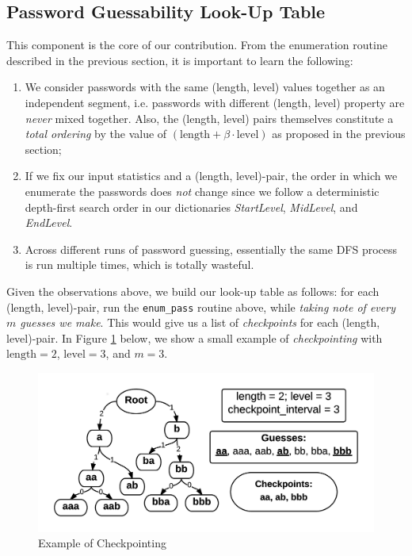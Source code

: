 \documentclass{article} %
\theoremstyle{definition}
\theoremstyle{theorem}
\theoremstyle{remark}
\theoremstyle{remark}
\begin{document}
\subsection{Password Guessability Look-Up Table} \label{sect:lookup}
\par\quad This component is the core of our contribution. From the enumeration routine described in the previous section, it is important to learn the following:
\begin{enumerate}
    \item We consider passwords with the same (length, level) values together as an independent segment, i.e. passwords with different (length, level) property are \emph{never} mixed together. Also, the (length, level) pairs themselves constitute a \emph{total ordering} by the value of $(\text{length} + \beta\cdot\text{level})$ as proposed in the previous section;
    \item If we fix our input statistics and a (length, level)-pair, the order in which we enumerate the passwords does \emph{not} change since we follow a deterministic depth-first search order in our dictionaries \emph{StartLevel}, \emph{MidLevel}, and \emph{EndLevel}.
    \item Across different runs of password guessing, essentially the same DFS process is run multiple times, which is totally wasteful. 
\end{enumerate}

\par\quad Given the observations above, we build our look-up table as follows: for each (length, level)-pair, run the \texttt{enum\_pass} routine above, while \emph{taking note of every $m$ guesses we make}. This would give us a list of \emph{checkpoints} for each (length, level)-pair. In Figure \ref{fig:checkpoint} below, we show a small example of \emph{checkpointing} with $\text{length}=2$, $\text{level}=3$, and $m=3$.

    \begin{figure}[!htbp]
        \vspace{-15pt}
        \begin{center}
            \includegraphics[width=.8\textwidth]{diag/checkpoint.png}
        \end{center}
        \vspace{-15pt}
        \caption{Example of Checkpointing}
         \vspace{-5pt}
        \label{fig:checkpoint}
    \end{figure}
\end{document}
